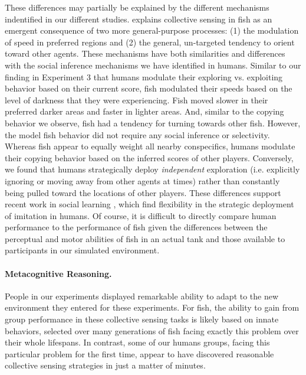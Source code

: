 \documentclass[12pt,letterpaper]{article}
\begin{document}
These differences may partially be explained by the different mechanisms indentified in our different studies.
 explains collective sensing in fish as an emergent consequence of two more general-purpose processes: (1) the modulation of speed in preferred regions and (2) the general, un-targeted tendency to orient toward other agents.
These mechanisms have both similarities and differences with the social inference mechanisms we have identified in humans.
Similar to our finding in Experiment 3 that humans modulate their exploring vs. exploiting behavior based on their current score, fish modulated their speeds based on the level of darkness that they were experiencing.  
Fish moved slower in their preferred darker areas and faster in lighter areas.  
And, similar to the copying behavior we observe, fish had a tendency for turning towards other fish.  
However, the model fish behavior  did not require any social inference or selectivity. 
Whereas fish appear to equally weight all nearby conspecifics, humans modulate their copying behavior based on the inferred scores of other players.
Conversely, we found that humans strategically deploy \emph{independent} exploration (i.e. explicitly ignoring or moving away from other agents at times) rather than constantly being pulled toward the locations of other players. 
These differences support recent work in social learning \cite{wisdom_social_2013, mcelreath_beyond_2008}, which find flexibility in the strategic deployment of imitation in humans.
Of course, it is difficult to directly compare human performance to the performance of fish given the differences between the perceptual and motor abilities of fish in an actual tank and those available to participants in our simulated environment.  

\paragraph{Metacognitive Reasoning.}

People in our experiments displayed remarkable ability to adapt to the new environment they entered for these experiments. For fish, the ability to
gain from group performance in these collective sensing tasks is
likely based on innate behaviors, selected over many generations of
fish facing exactly this problem over their whole lifespans.  In
contrast, some of our humans groups, facing this particular problem
for the first time, appear to have discovered reasonable collective
sensing strategies in just a matter of minutes.
\end{document}
